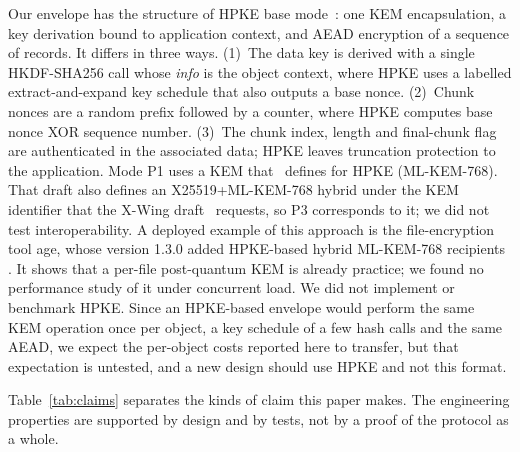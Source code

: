 \documentclass[conference]{IEEEtran}
\begin{document}
Our envelope has the structure of HPKE base mode~\cite{rfc9180}: one KEM encapsulation, a key
derivation bound to application context, and AEAD encryption of a sequence of records. It
differs in three ways. (1)~The data key is derived with a single HKDF-SHA256 call whose
\emph{info} is the object context, where HPKE uses a labelled extract-and-expand key schedule
that also outputs a base nonce. (2)~Chunk nonces are a random prefix followed by a counter, where
HPKE computes base nonce XOR sequence number. (3)~The chunk index, length and final-chunk flag
are authenticated in the associated data; HPKE leaves truncation protection to the application.
Mode P1 uses a KEM that~\cite{hpkepq} defines for HPKE (ML-KEM-768). That draft also defines an
X25519+ML-KEM-768 hybrid under the KEM identifier that the X-Wing draft~\cite{xwing} requests,
so P3 corresponds to it; we did not test interoperability. A deployed example of this approach is
the file-encryption tool age, whose version 1.3.0 added HPKE-based hybrid ML-KEM-768 recipients
\cite{age2025}. It shows that a per-file post-quantum KEM is already practice; we found no
performance study of it under concurrent load. We did not
implement or benchmark HPKE. Since an HPKE-based envelope would perform the same KEM operation
once per object, a key schedule of a few hash calls and the same AEAD, we expect the per-object
costs reported here to transfer, but that expectation is untested, and a new design should use
HPKE and not this format.

Table~\ref{tab:claims} separates the kinds of claim this paper makes. The engineering properties
are supported by design and by tests, not by a proof of the protocol as a whole.
\end{document}
